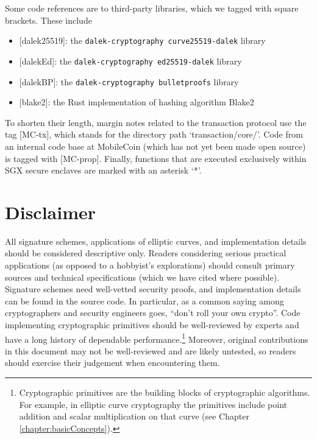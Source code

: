 Some code references are to third-party libraries, which we tagged with square brackets. These include
\begin{itemize}
    \item {[dalek25519]}: the {\tt dalek-cryptography curve25519-dalek} library \cite{dalek-curve25519-lib}
    \item {[dalekEd]}: the {\tt dalek-cryptography ed25519-dalek} library \cite{dalek-ed25519-lib}
    \item {[dalekBP]}: the {\tt dalek-cryptography bulletproofs} library \cite{dalek-bulletproofs-lib}
    \item {[blake2]}: the Rust implementation \cite{blake2-rust-lib} of hashing algorithm Blake2 \cite{blake-hashing-algorithm}
\end{itemize}

To shorten their length, margin notes related to the transaction protocol use the tag [MC-tx], which stands for the directory path `transaction/core/'. Code from an internal code base at MobileCoin (which has not yet been made open source) is tagged with [MC-prop]. Finally, functions that are executed exclusively within SGX secure enclaves are marked with an asterisk `*'.


\section{Disclaimer}

All signature schemes, applications of elliptic curves, and implementation details should be considered descriptive only. Readers considering serious practical applications (as opposed to a hobbyist's explorations) should consult primary sources and technical specifications (which we have cited where possible). Signature schemes need well-vetted security proofs, and implementation details can be found in the source code. In particular, as a common saying among cryptographers and security engineers goes, ``don't roll your own crypto''. Code implementing cryptographic primitives should be well-reviewed by experts and have a long history of dependable performance.\footnote{Cryptographic primitives are the building blocks of cryptographic algorithms. For example, in elliptic curve cryptography the primitives include point addition and scalar multiplication on that curve (see Chapter \ref{chapter:basicConcepts}).} Moreover, original contributions in this document may not be well-reviewed and are likely untested, so readers should exercise their judgement when encountering them.



